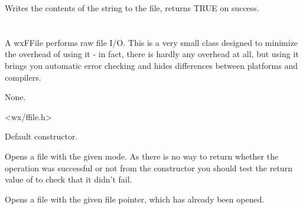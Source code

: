 \label{wxfilewrites}


Writes the contents of the string to the file, returns TRUE on success.

\section{}\label{wxffile}

A wxFFile performs raw file I/O. This is a very small class designed to
minimize the overhead of using it - in fact, there is hardly any overhead at
all, but using it brings you automatic error checking and hides differences
between platforms and compilers.


None.


<wx/ffile.h>

\twocolwidtha{7cm}
\begin{twocollist}\itemsep=0pt%
\end{twocollist}


\label{wxffileconstr}


Default constructor.


Opens a file with the given mode. As there is no way to return whether the
operation was successful or not from the constructor you should test the
return value of  to check that it didn't
fail.


Opens a file with the given file pointer, which has already been opened.




